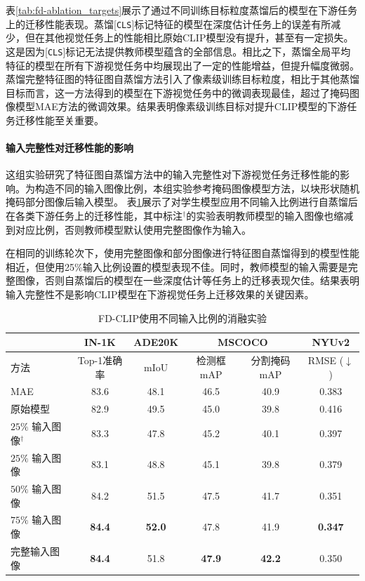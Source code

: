 表\ref{tab:fd-ablation_targets}展示了通过不同训练目标粒度蒸馏后的模型在下游任务上的迁移性能表现。蒸馏[\texttt{CLS}]标记特征的模型在深度估计任务上的误差有所减少，但在其他视觉任务上的性能相比原始CLIP模型没有提升，甚至有一定损失。这是因为[\texttt{CLS}]标记无法提供教师模型蕴含的全部信息。相比之下，蒸馏全局平均特征的模型在所有下游视觉任务中均展现出了一定的性能增益，但提升幅度微弱。蒸馏完整特征图的特征图自蒸馏方法引入了像素级训练目标粒度，相比于其他蒸馏目标而言，这一方法得到的模型在下游视觉任务中的微调表现最佳，超过了掩码图像模型MAE方法的微调效果。结果表明像素级训练目标对提升CLIP模型的下游任务迁移性能至关重要。

\paragraph{输入完整性对迁移性能的影响} 这组实验研究了特征图自蒸馏方法中的输入完整性对下游视觉任务迁移性能的影响。为构造不同的输入图像比例，本组实验参考掩码图像模型方法，以块形状随机掩码部分图像后输入模型。%
表\ref{tab:fd-ablation_masking}展示了对学生模型应用不同输入比例进行自蒸馏后在各类下游任务上的迁移性能，其中标注$^{\dag}$的实验表明教师模型的输入图像也缩减到对应比例，否则教师模型默认使用完整图像作为输入。

在相同的训练轮次下，使用完整图像和部分图像进行特征图自蒸馏得到的模型性能相近，但使用25\%输入比例设置的模型表现不佳。同时，教师模型的输入需要是完整图像，否则自蒸馏后的模型在一些深度估计等任务上的迁移表现欠佳。结果表明输入完整性不是影响CLIP模型在下游视觉任务上迁移效果的关键因素。
\begin{table}
\caption{FD-CLIP使用不同输入比例的消融实验
}
\centering
  \begin{tabular}{lccccc}
\toprule
   & IN-1K & ADE20K & \multicolumn{2}{c}{MSCOCO} & NYUv2 \\

   \midrule

   方法  &  Top-1准确率   &  mIoU  & 检测框mAP & 分割掩码mAP & RMSE\scriptsize{ ($\downarrow$)}\\
  \midrule

    MAE & 83.6 & 48.1 & 46.5 & 40.9 & 0.383 \\
    原始模型 & 82.9 & 49.5 & 45.0 & 39.8 & 0.416 \\ 
\midrule
  $25\%$ 输入图像$^{\dag}$ & 83.3 & 47.8 & 45.2 & 40.1 & 0.397 \\
  $25\%$ 输入图像 & 83.1 & 48.8 & 45.1& 39.8& 0.379 \\
  $50\%$ 输入图像 & 84.2 & 51.5 & 47.5& 41.7& 0.351 \\
  $75\%$ 输入图像 & \textbf{84.4} & \textbf{52.0} & 47.8& 41.9 & \textbf{0.347} \\
  完整输入图像 & \textbf{84.4} & 51.8 & \textbf{47.9} & \textbf{42.2} & 0.350 \\
\bottomrule
  \end{tabular}
\label{tab:fd-ablation_masking}
\end{table}

